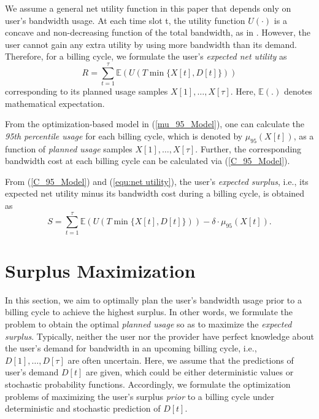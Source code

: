 \documentclass[10pt,journal,compsoc]{IEEEtran}
\begin{document}
We assume a general net utility function in this paper that depends only on user's bandwidth usage. At each time slot t, the utility function $U(\cdot)$ is a concave and non-decreasing function of the total bandwidth, as in \cite{Niu2012,He2012}.  However, 
the user cannot gain any extra utility by using more bandwidth than its demand. Therefore, for a billing cycle, we formulate the user's   \emph{expected net utility } as \begin{equation}
\label{equ:net utility}
R =\sum_{t=1}^{\tau} {\mathbb{E} (U(T\min\{X[t],D[t]\}))}
\end{equation}
corresponding to its planned usage samples $X[1], \ldots,X[\tau]$.
Here, $\mathbb{E} (.)$ denotes mathematical expectation.

 From the optimization-based model in (\ref{mu_95_Model}), one can calculate the   \emph{95th percentile usage} for each billing cycle, which is denoted by $\mu_{95}(X[t])$, as a function of \emph{planned usage} samples $X[1], \ldots,X[\tau]$. Further, the corresponding   bandwidth cost at each billing cycle can be calculated via (\ref{C_95_Model}).

From (\ref{C_95_Model}) and (\ref{equ:net utility}), the user's \emph{expected  surplus}, i.e., its  expected net utility minus its bandwidth cost during a billing cycle, is obtained as
\begin{equation}\label{equ:surplus}
S=\sum_{t=1}^{\tau} {\mathbb{E} \left(U(T\min\{X[t],D[t]\})\right)}-\delta \cdot \mu_{95}(X[t]).
\end{equation}






















\section{Surplus Maximization}\label{subsec:surplusmaximization}
In this section, we aim to optimally plan the user's bandwidth usage  prior to a billing cycle to achieve the highest  	surplus.
In other words, we formulate the problem to obtain the optimal \emph{planned usage} so as to maximize the \emph{expected surplus}.
Typically, neither the user nor the provider have perfect knowledge about the user's demand for bandwidth in an upcoming billing cycle, i.e.,  $D[1], \ldots, D[\tau]$ are often uncertain. 
Here, we assume that the predictions of user's demand $D[t]$ are given, which could be either deterministic values or stochastic probability functions.  
Accordingly, we formulate the optimization problems  of maximizing the user's surplus \emph{prior} to a billing cycle under deterministic and stochastic prediction of $D[t]$.
\end{document}
